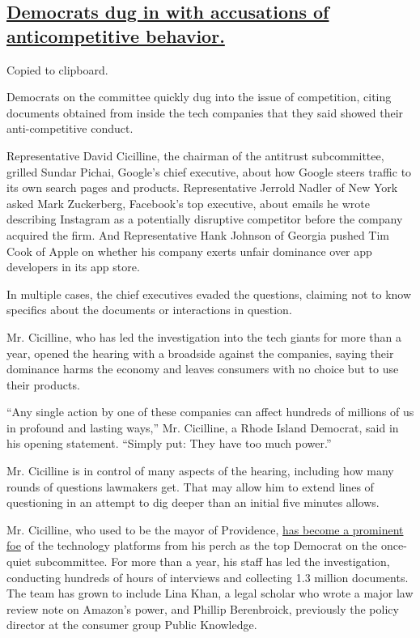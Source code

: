 \hypertarget{democrats-dug-in-with-accusations-of-anticompetitive-behavior}{%
\subsection{\texorpdfstring{\protect\hyperlink{democrats-dug-in-with-accusations-of-anticompetitive-behavior}{Democrats
dug in with accusations of anticompetitive
behavior.}}{Democrats dug in with accusations of anticompetitive behavior.}}\label{democrats-dug-in-with-accusations-of-anticompetitive-behavior}}

Copied to clipboard.

Democrats on the committee quickly dug into the issue of competition,
citing documents obtained from inside the tech companies that they said
showed their anti-competitive conduct.

Representative David Cicilline, the chairman of the antitrust
subcommittee, grilled Sundar Pichai, Google's chief executive, about how
Google steers traffic to its own search pages and products.
Representative Jerrold Nadler of New York asked Mark Zuckerberg,
Facebook's top executive, about emails he wrote describing Instagram as
a potentially disruptive competitor before the company acquired the
firm. And Representative Hank Johnson of Georgia pushed Tim Cook of
Apple on whether his company exerts unfair dominance over app developers
in its app store.

In multiple cases, the chief executives evaded the questions, claiming
not to know specifics about the documents or interactions in question.

Mr. Cicilline, who has led the investigation into the tech giants for
more than a year, opened the hearing with a broadside against the
companies, saying their dominance harms the economy and leaves consumers
with no choice but to use their products.

``Any single action by one of these companies can affect hundreds of
millions of us in profound and lasting ways,'' Mr. Cicilline, a Rhode
Island Democrat, said in his opening statement. ``Simply put: They have
too much power.''

Mr. Cicilline is in control of many aspects of the hearing, including
how many rounds of questions lawmakers get. That may allow him to extend
lines of questioning in an attempt to dig deeper than an initial five
minutes allows.

Mr. Cicilline, who used to be the mayor of Providence,
\href{https://slack-redir.net/link?url=https\%3A\%2F\%2Fwww.nytimes3xbfgragh.onion\%2F2019\%2F12\%2F08\%2Ftechnology\%2FDavid-Cicilline-antitrust-tech.html}{has
become a prominent foe} of the technology platforms from his perch as
the top Democrat on the once-quiet subcommittee. For more than a year,
his staff has led the investigation, conducting hundreds of hours of
interviews and collecting 1.3 million documents. The team has grown to
include Lina Khan, a legal scholar who wrote a major law review note on
Amazon's power, and Phillip Berenbroick, previously the policy director
at the consumer group Public Knowledge.

